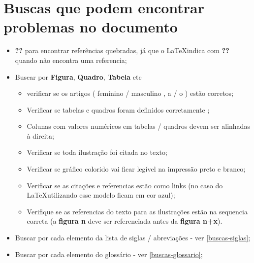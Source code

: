 \section{Buscas que podem encontrar problemas no documento}
\label{buscas-documento}

\begin{itemize}
    \item \textbf{??} para encontrar referências quebradas, já que o \LaTeX \space indica com \textbf{??} quando não encontra uma referencia;
    
    \item Buscar por \textbf{Figura}, \textbf{Quadro}, \textbf{Tabela} etc
    
        \begin{itemize}
            \item verificar se os artigos ( feminino / masculino ,  a / o  ) estão corretos;
           
            \item Verificar se tabelas e quadros foram definidos corretamente ;
           
            \item Colunas com valores numéricos em tabelas / quadros devem ser alinhadas à direita;
           
            \item Verificar se toda ilustração foi citada no texto;
           
            \item Verificar se gráfico colorido vai ficar legível na impressão preto e branco;
            
            \item Verificar se as citações e referencias estão como links (no caso do \LaTeX \space utilizando esse modelo ficam em cor azul);
          
            \item Verifique se as referencias do texto para as ilustrações estão na sequencia correta (a \textbf{figura n} deve ser referenciada antes da \textbf{figura n+x}).  
        \end{itemize}
        
    \item Buscar por cada elemento da lista de siglas / abreviações - ver \autoref{buscas-siglas};
    
    \item Buscar por cada elemento do glossário - ver \autoref{buscas-glossario};
            

\end{itemize}
